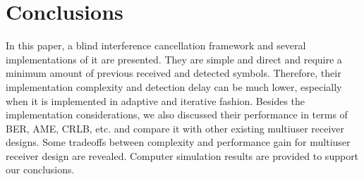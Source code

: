 \documentclass[conference]{IEEEtran}
\begin{document}
\section{Conclusions}
In this paper, a blind interference cancellation framework and
several implementations of it are presented. They are simple and
direct and require a minimum amount of previous received and
detected symbols. Therefore, their implementation complexity and
detection delay can be much lower, especially when it is
implemented in adaptive and iterative fashion. Besides the
implementation considerations, we also discussed their performance
in terms of BER, AME, CRLB, etc. and compare it with other
existing multiuser receiver designs.  Some tradeoffs between
complexity and performance gain for multiuser receiver design are
revealed. Computer simulation results are provided to support our
conclusions.



\end{document}
